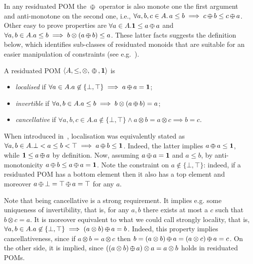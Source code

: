 \documentclass{llncs}
\def\1{{\mathbf 1}}
\def\monid{{\mathbf 0}}
\def\1{{\mathbf 1}}
\def\monop{\otimes}
\def\odiv{\, {\ominus\hspace{-7.7pt} \div} \,}
\def\monid{\mathbf{1}}
\begin{document}
In any residuated POM the $\odiv$ operator is also monote one the first argument and 
anti-monotone on the second one, i.e., 
$\forall a, b, c \in A.\, a\leq b \implies  c\odiv b \leq c \odiv a$.
%
Other easy to prove properties are
$\forall a\in A. \monid \leq a \odiv a$ and
$\forall a, b \in A. a \leq b \implies b \monop (a \odiv b) \leq a$.
%
%
%
%
%
These latter facts suggests the definition below, which identifies sub-classes 
of residuated monoids that are suitable for an easier manipulation
of constraints (see e.g.~\cite{ecai06}).

\begin{definition}[families]
	A residuated POM $\langle A, \leq, \monop, \odiv, \monid \rangle$ is
	\begin{itemize}
		\item
		\emph{localised} if $\forall a \in A. a \not \in \{\bot,\top\} \implies a \odiv a = \1$;
		\item
		\emph{invertible} if $\forall a, b \in A. a \leq b \implies b \monop (a \odiv b) = a$;
		\item
		\emph{cancellative} if $\forall a, b, c \in A. a \not \in \{\bot,\top\} \wedge a \otimes b = a  \otimes c \implies b = c$.
	\end{itemize}
\end{definition}

\begin{remark}
When introduced in~\cite[Def.~2.4]{ipl17}, localisation was equivalently stated as 
$\forall a, b \in A. \bot < a \leq b<\top \implies a \odiv b \leq \1$.
Indeed, the latter implies $a \odiv a \leq \1$, while  $\1 \leq a \odiv a$
by definition. Now, assuming $a \odiv a = \1$ and $a \leq b$, 
by anti-monotonicity $a \odiv b \leq a \odiv a = \1$.
Note the constraint on $a \not \in \{\bot,\top\}$: indeed, if a residuated POM 
has a bottom element then it also has a top element and moreover 
$a \odiv \bot = \top \odiv a = \top$ for any  $a$.

Note that being cancellative is a strong requirement. It implies e.g. 
some uniqueness of invertibility, that is, for any $a, b$ there exists 
at most a $c$ such that $b\otimes c = a$.
It is moreover equivalent to what we could call strongly locality,
that is, $\forall a, b \in A. a \not \in \{\bot,\top\} \implies (a \otimes b) \odiv a = b$. 
Indeed, this property implies cancellativeness, since if $a \otimes b = a \otimes c$ 
then $b = (a \otimes b) \odiv a = (a \otimes c) \odiv a = c$. On the other side,
it is implied, since 
$((a \otimes b) \odiv a)\otimes a = a \otimes b$ holds in residuated POMs.
\end{remark}
\end{document}
